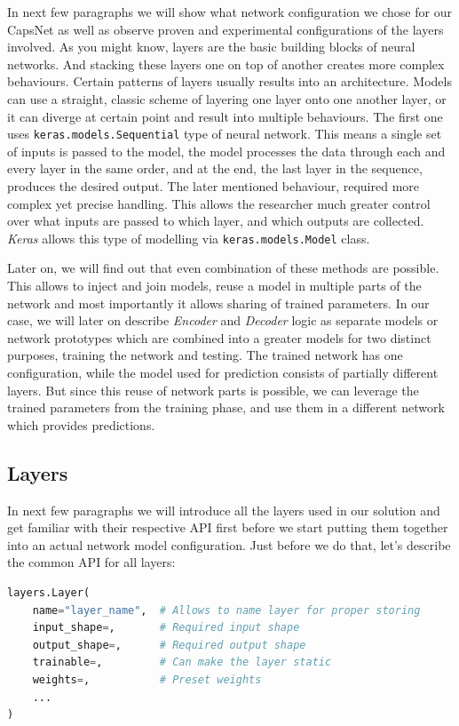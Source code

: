 In next few paragraphs we will show what network configuration we chose for our CapsNet as well as observe proven and experimental configurations of the layers involved. As you might know, layers are the basic building blocks of neural networks. And stacking these layers one on top of another creates more complex behaviours. Certain patterns of layers usually results into an architecture. Models can use a straight, classic scheme of layering one layer onto one another layer, or it can diverge at certain point and result into multiple behaviours. The first one uses \texttt{keras.models.Sequential} type of neural network. This means a single set of inputs is passed to the model, the model processes the data through each and every layer in the same order, and at the end, the last layer in the sequence, produces the desired output. The later mentioned behaviour, required more complex yet precise handling. This allows the researcher much greater control over what inputs are passed to which layer, and which outputs are collected. \textit{Keras} allows this type of modelling via \texttt{keras.models.Model} class.

Later on, we will find out that even combination of these methods are possible. This allows to inject and join models, reuse a model in multiple parts of the network and most importantly it allows sharing of trained parameters. In our case, we will later on describe \textit{Encoder} and \textit{Decoder} logic as separate models or network prototypes which are combined into a greater models for two distinct purposes, training the network and testing. The trained network has one configuration, while the model used for prediction consists of partially different layers. But since this reuse of network parts is possible, we can leverage the trained parameters from the training phase, and use them in a different network which provides predictions.

\subsection{Layers}

In next few paragraphs we will introduce all the layers used in our solution and get familiar with their respective API first before we start putting them together into an actual network model configuration. Just before we do that, let's describe the common API for all layers:

\begin{lstlisting}[language=Python, caption=Common layer API]
layers.Layer(
    name="layer_name",  # Allows to name layer for proper storing
    input_shape=,       # Required input shape
    output_shape=,      # Required output shape
    trainable=,         # Can make the layer static
    weights=,           # Preset weights
    ...
)
\end{lstlisting}

